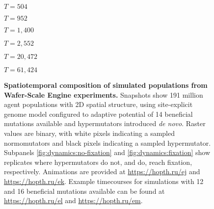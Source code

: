 \begin{figure}[ht]
  \begin{minipage}[c]{0.154\textwidth}
\hfill
\begin{varwidth}{\textwidth}
$T = 504$
\end{varwidth}
\hfill
  \end{minipage}
  \begin{minipage}[c]{0.154\textwidth}
\hfill
\begin{varwidth}{\textwidth}
$T = 952$
\end{varwidth}
\hfill
  \end{minipage}
  \begin{minipage}[c]{0.154\textwidth}
\hfill
\begin{varwidth}{\textwidth}
$T = 1,400$
\end{varwidth}
\hfill
  \end{minipage}
  \begin{minipage}[c]{0.154\textwidth}
\hfill
\begin{varwidth}{\textwidth}
$T = 2,552$
\end{varwidth}
\hfill
  \end{minipage}
  \begin{minipage}[c]{0.154\textwidth}
\hfill
\begin{varwidth}{\textwidth}
$T = 20,472$
\end{varwidth}
\hfill
  \end{minipage}
  \begin{minipage}[c]{0.154\textwidth}
\hfill
\begin{varwidth}{\textwidth}
$T = 61,424$
\end{varwidth}
\hfill
  \end{minipage}
  \caption{
  \textbf{Spatiotemporal composition of simulated populations from Wafer-Scale Engine experiments.}
  \footnotesize
  Snapshots show 191 million agent populations with 2D spatial structure, using site-explicit genome model configured to adaptive potential of 14 beneficial mutations available and hypermutators introduced \textit{de novo}.
  Raster values are binary, with white pixels indicating a sampled normomutators and black pixels indicating a sampled hypermutator.
  Subpanels \ref{fig:dynamics:no-fixation} and       \ref{fig:dynamics:fixation} show replicates where hypermutators do not, and do, reach fixation, respectively.
  Animations are provided at \url{https://hopth.ru/ej} and \url{https://hopth.ru/ek}.
  Example timecourses for simulations with 12 and 16 beneficial mutations available can be found at \url{https://hopth.ru/el} and \url{https://hopth.ru/em}.
  }
\end{figure}
